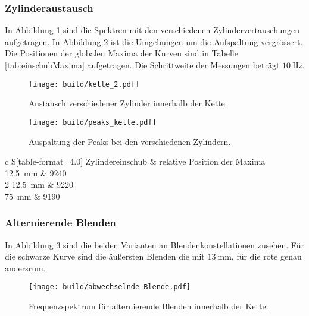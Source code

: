 \subsubsection{Zylinderaustausch}
In Abbildung \ref{fig:austausch} sind die Spektren mit den verschiedenen
Zylindervertauschungen aufgetragen.
In Abbildung \ref{fig:peaks} ist die Umgebungen um die Aufspaltung vergrössert.
Die Positionen der globalen Maxima der Kurven sind in Tabelle \ref{tab:einschubMaxima} aufgetragen.
Die Schrittweite der Messungen beträgt $\SI{10}{\hertz}$.
\begin{figure}
	\centering
	\texttt{[image: build/kette\_2.pdf]}
	\caption{Austausch verschiedener Zylinder innerhalb der Kette.}
	\label{fig:austausch}
\end{figure}

\begin{figure}
	\centering
	\texttt{[image: build/peaks\_kette.pdf]}
	\caption{Auspaltung der Peaks bei den verschiedenen Zylindern.}
	\label{fig:peaks}
\end{figure}

\begin{table}
	\centering
	\caption{Austausch eines Zylinders gegen unterschiedlich lange andere Zylinder.}
	\label{tab:einschubMaxima}
	\begin{tabular}{c S[table-format=4.0]}
		\toprule
		{Zylindereinschub} & {relative Position der Maxima} \\
		 \times \SI{12.5}{\milli\meter}  & 9240 \\
		2 \times \SI{12.5}{\milli\meter}   & 9220 \\
		\SI{75}{\milli\meter} & 9190 \\
		\bottomrule
	\end{tabular}
\end{table}

\newpage
\subsubsection{Alternierende Blenden}
In Abbildung \ref{fig:alt} sind die beiden Varianten an Blendenkonstellationen zusehen.
Für die schwarze Kurve sind die äußersten Blenden die mit $\SI{13}{\milli\meter}$,
für die rote genau andersrum.
\begin{figure}
	\centering
	\texttt{[image: build/abwechselnde-Blende.pdf]}
	\caption{Frequenzspektrum für alternierende Blenden innerhalb der Kette.}
	\label{fig:alt}
\end{figure}
